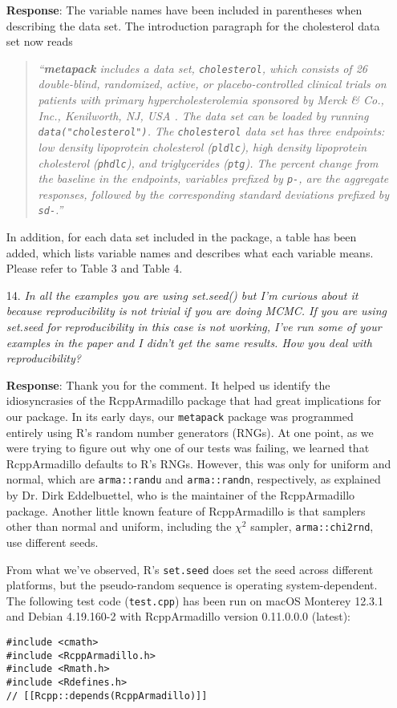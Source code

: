 \documentclass[11pt]{article}
\newcommand{\1}{{\bf{{1}}}}
\begin{document}
\begin{itemize}
\medskip
\noindent
{\bf Response}: The variable names have been included in parentheses when describing the data set. The introduction paragraph for the cholesterol data set now reads
\begin{quote}
    \textit{``\textbf{metapack} includes a data set, \texttt{cholesterol}, which consists of 26 double-blind, randomized, active, or placebo-controlled clinical trials on patients with primary hypercholesterolemia sponsored by Merck \& Co., Inc., Kenilworth, NJ, USA \citep{yao2015bayesian}. The data set can be loaded by running \texttt{data("cholesterol")}. The \texttt{cholesterol} data set has three endpoints: low density lipoprotein cholesterol (\texttt{pldlc}), high density lipoprotein cholesterol (\texttt{phdlc}), and triglycerides (\texttt{ptg}). The percent change from the baseline in the endpoints, variables prefixed by \texttt{p-}, are the aggregate responses, followed by the corresponding standard deviations prefixed by \texttt{sd-}.''}
\end{quote}
In addition, for each data set included in the package, a table has been added, which lists variable names and describes what each variable means. Please refer to Table 3 and Table 4.


\item[14.] {\it In all the examples you are using set.seed() but I'm curious about it because reproducibility is not trivial if you are doing MCMC. If you are using set.seed for reproducibility in this case is not working, I've run some of your examples in the paper and I didn't get the same results. How you deal with reproducibility?}

\medskip
\noindent
{\bf Response}: Thank you for the comment. It helped us identify the idiosyncrasies of the RcppArmadillo package that had great implications for our package. In its early days, our \texttt{metapack} package was programmed entirely using R's random number generators (RNGs). At one point, as we were trying to figure out why one of our tests was failing, we learned that RcppArmadillo defaults to R's RNGs. However, this was only for uniform and normal, which are \texttt{arma::randu} and \texttt{arma::randn}, respectively, as explained by Dr. Dirk Eddelbuettel, who is the maintainer of the RcppArmadillo package. Another little known feature of RcppArmadillo is that samplers other than normal and uniform, including the $\chi^2$ sampler, \texttt{arma::chi2rnd}, use different seeds.

From what we've observed, R's \texttt{set.seed} does set the seed across different platforms, but the pseudo-random sequence is operating system-dependent. The following test code (\texttt{test.cpp}) has been run on macOS Monterey 12.3.1 and Debian 4.19.160-2 with RcppArmadillo version 0.11.0.0.0 (latest):
\begin{verbatim}
#include <cmath>
#include <RcppArmadillo.h>
#include <Rmath.h>
#include <Rdefines.h>
// [[Rcpp::depends(RcppArmadillo)]]


\end{verbatim}
\end{itemize}
\end{document}
